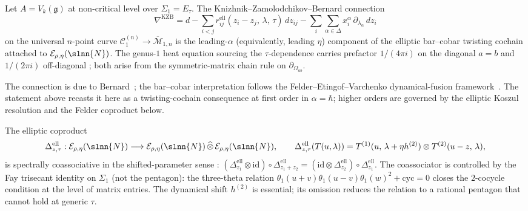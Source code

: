 \begin{theorem}
\label{thm:kzb-as-bar-cobar-alpha}
\ClaimStatusProvedElsewhere
Let $A = V_k(\mathfrak g)$ at non-critical level over $\Sigma_1 =
E_\tau$. The Knizhnik--Zamolodchikov--Bernard connection
\[
\nabla^{\mathrm{KZB}}
= d - \sum_{i<j} r^{\mathrm{ell}}_{ij}(z_i - z_j,\,\lambda,\,\tau)\,
 dz_{ij}
 - \sum_i \sum_{\alpha \in \Delta} x_i^\alpha\, \partial_{\lambda_\alpha}\,
 dz_i
\]
on the universal $n$-point curve $\mathcal C^{(n)}_1 \to \overline
{\mathcal M}_{1,n}$ is the leading-$\alpha$ (equivalently, leading
$\eta$) component of the elliptic bar--cobar twisting cochain
attached to $\mathcal E_{\rho,\eta}(\slnn{N})$. The genus-$1$ heat
equation sourcing the $\tau$-dependence carries prefactor
$1/(4\pi i)$ on the diagonal $a=b$ and $1/(2\pi i)$ off-diagonal
; both arise from the symmetric-matrix chain rule on
$\partial_{\Omega_{ab}}$.
\end{theorem}

\begin{remark}[Attribution]
\label{rem:kzb-attribution}
The connection is due to Bernard~\cite{Ber88}; the bar--cobar
interpretation follows the Felder--Etingof--Varchenko
dynamical-fusion framework~\cite{Fel94}. The statement above
recasts it here as a twisting-cochain
consequence at first order in $\alpha = \hbar$; higher orders
are governed by the elliptic Koszul resolution and the Felder
coproduct below.
\end{remark}

\begin{proposition}
\label{prop:elliptic-coproduct-coassoc-fay}
\ClaimStatusProvedHere
The elliptic coproduct
\[
\Delta^{\mathrm{ell}}_{z,\tau}:
\mathcal E_{\rho,\eta}(\slnn{N})
\longrightarrow
\mathcal E_{\rho,\eta}(\slnn{N})
\,\widehat\otimes\, \mathcal E_{\rho,\eta}(\slnn{N}),
\qquad
\Delta^{\mathrm{ell}}_{z,\tau}(T(u,\lambda))
= T^{(1)}(u,\, \lambda + \eta h^{(2)})\otimes T^{(2)}(u-z,\, \lambda),
\]
is spectrally coassociative in the shifted-parameter sense
: $(\Delta^{\mathrm{ell}}_{z_1} \otimes \mathrm{id}) \circ
\Delta^{\mathrm{ell}}_{z_1+z_2} = (\mathrm{id}\otimes
\Delta^{\mathrm{ell}}_{z_2})\circ \Delta^{\mathrm{ell}}_{z_1}$.
The coassociator is controlled by the Fay trisecant identity on
$\Sigma_1$ (not the pentagon): the three-theta relation
$\theta_1(u+v)\theta_1(u-v)\theta_1(w)^2 +
\mathrm{cyc} = 0$ closes the $2$-cocycle condition at the level of
matrix entries. The dynamical shift $h^{(2)}$ is essential; its
omission reduces the relation to a rational pentagon that cannot
hold at generic $\tau$.
\end{proposition}

